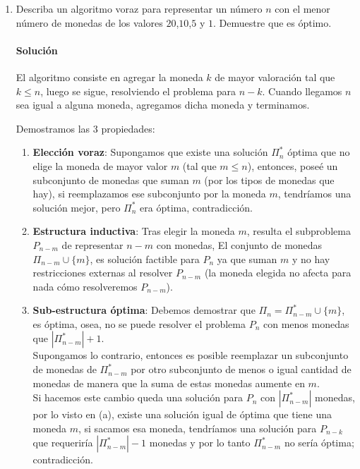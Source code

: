 \documentclass[spanish, fleqn]{article}
\begin{document}
\begin{enumerate}
\begin{enumerate}
\end{enumerate}

\item Describa un algoritmo voraz para representar un número $n$ con el menor número de monedas de los valores $20$,$10$,$5$ y $1$. Demuestre que es óptimo.

\paragraph{Solución} El algoritmo consiste en agregar la moneda $k$ de mayor valoración tal que $k\leq n$, luego se sigue, resolviendo el problema para $n-k$. Cuando llegamos $n$ sea igual a alguna moneda, agregamos dicha moneda y terminamos.

Demostramos las 3 propiedades:
\begin{enumerate}
\item \textbf{Elección voraz}: Supongamos que existe una solución $\Pi_n^*$ óptima que no elige la moneda de mayor valor $m$ (tal que $m\leq n$), entonces, poseé un subconjunto de monedas que suman $m$ (por los tipos de monedas que hay), si reemplazamos ese subconjunto por la moneda $m$, tendríamos una solución mejor, pero $\Pi_n^*$ era óptima, contradicción.
\item \textbf{Estructura inductiva}: Tras elegir la moneda $m$, resulta el subproblema $P_{n-m}$ de representar $n-m$ con monedas, El conjunto de monedas $\Pi_{n-m} \cup \{m\}$, es solución factible para $P_n$ ya que suman $m$ y no hay restricciones externas al resolver $P_{n-m}$ (la moneda elegida no afecta para nada cómo resolveremos $P_{n-m}$).
\item \textbf{Sub-estructura óptima}: Debemos demostrar que $\Pi_n= \Pi_{n-m}^* \cup \{m\}$, es óptima, osea, no se puede resolver el problema $P_n$ con menos monedas que $|\Pi_{n-m}^*|+1$.
\\ Supongamos lo contrario, entonces es posible reemplazar un subconjunto de monedas de $\Pi_{n-m}^*$ por otro subconjunto de menos o igual cantidad de monedas de manera que la suma de estas monedas aumente en $m$.
\\Si hacemos este cambio queda una solución para $P_n$ con $|\Pi_{n-m}^*|$ monedas, por lo visto en (a), existe una solución igual de óptima que tiene una moneda $m$, si sacamos esa moneda, tendríamos una solución para $P_{n-k}$ que requeriría $|\Pi_{n-m}^*|-1$ monedas y por lo tanto $\Pi_{n-m}^*$ no sería óptima; contradicción.
\end{enumerate}


\end{enumerate}
\end{document}
